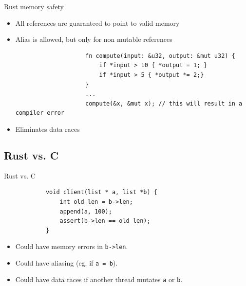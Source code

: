 \documentclass[usenames,dvipsnames,aspectratio=169]{beamer}
\begin{document}
\begin{frame}[fragile]{Rust memory safety}
    \begin{itemize}
        \item All references are guaranteed to point to valid memory
        \item Alias is allowed, but only for non mutable references
            \begin{block}{}
                \begin{verbatim}
                    fn compute(input: &u32, output: &mut u32) {
                        if *input > 10 { *output = 1; }
                        if *input > 5 { *output *= 2;}
                    }
                    ...
                    compute(&x, &mut x); // this will result in a compiler error
                \end{verbatim}
            \end{block}
        \item Eliminates data races
    \end{itemize}
\end{frame}

\subsection{Rust vs. C}
\begin{frame}[fragile]{Rust vs. C}
    \begin{block}{}
        \begin{verbatim}
            void client(list * a, list *b) {
                int old_len = b->len;
                append(a, 100);
                assert(b->len == old_len);
            }
        \end{verbatim}
    \end{block}
    \begin{itemize}
        \item Could have memory errors in \texttt{b->len}.
        \item Could have aliasing (eg. if \texttt{a = b}).
        \item Could have data races if another thread mutates \texttt{a} or \texttt{b}.
    \end{itemize}
\end{frame}
\end{document}
